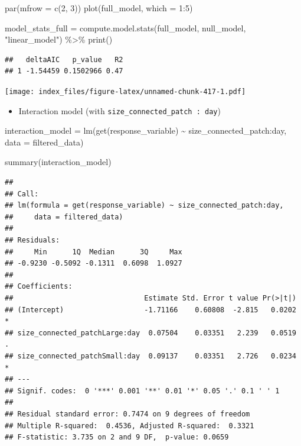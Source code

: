 \documentclass[
]{article}
\newenvironment{Shaded}{\begin{snugshade}}{\end{snugshade}}
\newcommand{\AttributeTok}[1]{\textcolor[rgb]{0.77,0.63,0.00}{#1}}
\newcommand{\DecValTok}[1]{\textcolor[rgb]{0.00,0.00,0.81}{#1}}
\newcommand{\FunctionTok}[1]{\textcolor[rgb]{0.00,0.00,0.00}{#1}}
\newcommand{\NormalTok}[1]{#1}
\newcommand{\OtherTok}[1]{\textcolor[rgb]{0.56,0.35,0.01}{#1}}
\newcommand{\SpecialCharTok}[1]{\textcolor[rgb]{0.00,0.00,0.00}{#1}}
\newcommand{\StringTok}[1]{\textcolor[rgb]{0.31,0.60,0.02}{#1}}
\providecommand{\tightlist}{%
  \setlength{\itemsep}{0pt}\setlength{\parskip}{0pt}}
\begin{document}
\begin{Shaded}
\begin{Highlighting}[]
\FunctionTok{par}\NormalTok{(}\AttributeTok{mfrow =} \FunctionTok{c}\NormalTok{(}\DecValTok{2}\NormalTok{, }\DecValTok{3}\NormalTok{))}
\FunctionTok{plot}\NormalTok{(full\_model, }\AttributeTok{which =} \DecValTok{1}\SpecialCharTok{:}\DecValTok{5}\NormalTok{)}

\NormalTok{model\_stats\_full }\OtherTok{=} \FunctionTok{compute.model.stats}\NormalTok{(full\_model,}
\NormalTok{                                       null\_model,}
                                       \StringTok{"linear\_model"}\NormalTok{) }\SpecialCharTok{\%\textgreater{}\%}
  \FunctionTok{print}\NormalTok{()}
\end{Highlighting}
\end{Shaded}

\begin{verbatim}
##   deltaAIC   p_value   R2
## 1 -1.54459 0.1502966 0.47
\end{verbatim}

\texttt{[image: index\_files/figure-latex/unnamed-chunk-417-1.pdf]}

\begin{itemize}
\tightlist
\item
  Interaction model (with \texttt{size\_connected\_patch\ :\ day})
\end{itemize}

\begin{Shaded}
\begin{Highlighting}[]
\NormalTok{interaction\_model }\OtherTok{=} \FunctionTok{lm}\NormalTok{(}\FunctionTok{get}\NormalTok{(response\_variable) }\SpecialCharTok{\textasciitilde{}}
\NormalTok{                         size\_connected\_patch}\SpecialCharTok{:}\NormalTok{day,}
                       \AttributeTok{data =}\NormalTok{ filtered\_data)}

\FunctionTok{summary}\NormalTok{(interaction\_model)}
\end{Highlighting}
\end{Shaded}

\begin{verbatim}
## 
## Call:
## lm(formula = get(response_variable) ~ size_connected_patch:day, 
##     data = filtered_data)
## 
## Residuals:
##     Min      1Q  Median      3Q     Max 
## -0.9230 -0.5092 -0.1311  0.6098  1.0927 
## 
## Coefficients:
##                               Estimate Std. Error t value Pr(>|t|)  
## (Intercept)                   -1.71166    0.60808  -2.815   0.0202 *
## size_connected_patchLarge:day  0.07504    0.03351   2.239   0.0519 .
## size_connected_patchSmall:day  0.09137    0.03351   2.726   0.0234 *
## ---
## Signif. codes:  0 '***' 0.001 '**' 0.01 '*' 0.05 '.' 0.1 ' ' 1
## 
## Residual standard error: 0.7474 on 9 degrees of freedom
## Multiple R-squared:  0.4536, Adjusted R-squared:  0.3321 
## F-statistic: 3.735 on 2 and 9 DF,  p-value: 0.0659
\end{verbatim}
\end{document}
